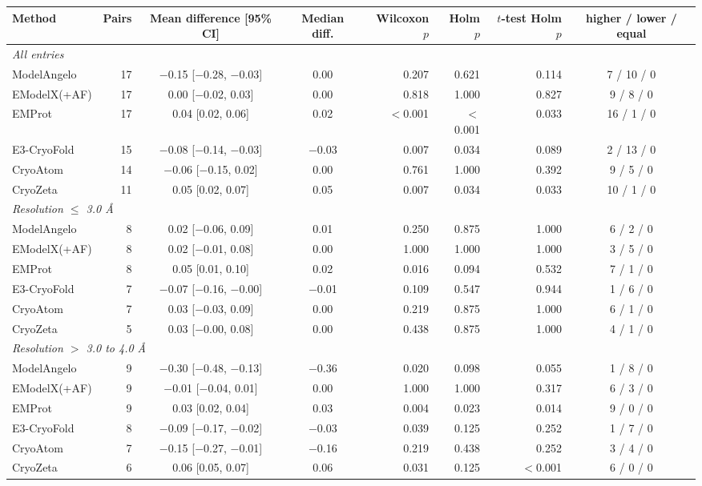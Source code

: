 \begin{tabular}{lrccrrrc}
\toprule
Method & Pairs & Mean difference [95\% CI] & Median diff. & Wilcoxon $p$ & Holm $p$ & $t$-test Holm $p$ & higher / lower / equal \\
\midrule
\multicolumn{8}{l}{\emph{All entries}} \\
ModelAngelo & 17 & $-$0.15 [$-$0.28, $-$0.03] & 0.00 & 0.207 & 0.621 & 0.114 & 7 / 10 / 0 \\
EModelX(+AF) & 17 & 0.00 [$-$0.02, 0.03] & 0.00 & 0.818 & 1.000 & 0.827 & 9 / 8 / 0 \\
EMProt & 17 & 0.04 [0.02, 0.06] & 0.02 & $<$0.001 & $<$0.001 & 0.033 & 16 / 1 / 0 \\
E3-CryoFold & 15 & $-$0.08 [$-$0.14, $-$0.03] & $-$0.03 & 0.007 & 0.034 & 0.089 & 2 / 13 / 0 \\
CryoAtom & 14 & $-$0.06 [$-$0.15, 0.02] & 0.00 & 0.761 & 1.000 & 0.392 & 9 / 5 / 0 \\
CryoZeta & 11 & 0.05 [0.02, 0.07] & 0.05 & 0.007 & 0.034 & 0.033 & 10 / 1 / 0 \\
\midrule
\multicolumn{8}{l}{\emph{Resolution $\leq$ 3.0 \AA}} \\
ModelAngelo & 8 & 0.02 [$-$0.06, 0.09] & 0.01 & 0.250 & 0.875 & 1.000 & 6 / 2 / 0 \\
EModelX(+AF) & 8 & 0.02 [$-$0.01, 0.08] & 0.00 & 1.000 & 1.000 & 1.000 & 3 / 5 / 0 \\
EMProt & 8 & 0.05 [0.01, 0.10] & 0.02 & 0.016 & 0.094 & 0.532 & 7 / 1 / 0 \\
E3-CryoFold & 7 & $-$0.07 [$-$0.16, $-$0.00] & $-$0.01 & 0.109 & 0.547 & 0.944 & 1 / 6 / 0 \\
CryoAtom & 7 & 0.03 [$-$0.03, 0.09] & 0.00 & 0.219 & 0.875 & 1.000 & 6 / 1 / 0 \\
CryoZeta & 5 & 0.03 [$-$0.00, 0.08] & 0.00 & 0.438 & 0.875 & 1.000 & 4 / 1 / 0 \\
\midrule
\multicolumn{8}{l}{\emph{Resolution $>$ 3.0 to 4.0 \AA}} \\
ModelAngelo & 9 & $-$0.30 [$-$0.48, $-$0.13] & $-$0.36 & 0.020 & 0.098 & 0.055 & 1 / 8 / 0 \\
EModelX(+AF) & 9 & $-$0.01 [$-$0.04, 0.01] & 0.00 & 1.000 & 1.000 & 0.317 & 6 / 3 / 0 \\
EMProt & 9 & 0.03 [0.02, 0.04] & 0.03 & 0.004 & 0.023 & 0.014 & 9 / 0 / 0 \\
E3-CryoFold & 8 & $-$0.09 [$-$0.17, $-$0.02] & $-$0.03 & 0.039 & 0.125 & 0.252 & 1 / 7 / 0 \\
CryoAtom & 7 & $-$0.15 [$-$0.27, $-$0.01] & $-$0.16 & 0.219 & 0.438 & 0.252 & 3 / 4 / 0 \\
CryoZeta & 6 & 0.06 [0.05, 0.07] & 0.06 & 0.031 & 0.125 & $<$0.001 & 6 / 0 / 0 \\
\bottomrule
\end{tabular}
